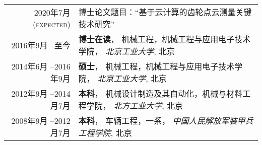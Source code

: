 %
%


\renewcommand{\arraystretch}{1.5}
\begin{tabular}{rl}	
	\textsc{2020年7月(expected)}			  & 博士论文题目：``基于云计算的齿轮点云测量关键技术研究''\\
	\textsc{2016年9月 --至今}			  & \textbf{博士在读}， 机械工程，机械工程与应用电子技术学院， \emph{北京工业大学}, 北京\\
	\textsc{2014年6月 --2016年9月}	  &  \textbf{硕士}， 机械工程，机械工程与应用电子技术学院， \emph{北京工业大学}, 北京 \\
	\textsc{2012年9月 --2014月7月} 	&  \textbf{本科}， 机械设计制造及其自动化，机械与材料工程学院， \emph{北方工业大学}, 北京\\
	\textsc{2008年9月 --2012月7月} 	&  \textbf{本科}， 车辆工程，一系， \emph{中国人民解放军装甲兵工程学院}, 北京\\
										
\end{tabular}